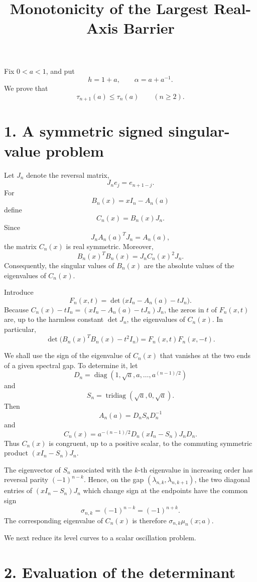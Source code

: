 \documentclass[11pt]{article}
\title{Monotonicity of the Largest Real-Axis Barrier}
\author{}
\date{}
\DeclareMathOperator{\tridiag}{tridiag}
\begin{document}
\maketitle

Fix \(0<a<1\), and put
\[
h=1+a,
\qquad
\alpha=a+a^{-1}.
\]
We prove that
\[
\tau_{n+1}(a)\leq \tau_n(a)
\qquad(n\geq2).
\]

\section*{1. A symmetric signed singular-value problem}

Let \(J_n\) denote the reversal matrix,
\[
J_ne_j=e_{n+1-j}.
\]
For
\[
B_n(x)=xI_n-A_n(a)
\]
define
\[
C_n(x)=B_n(x)J_n.
\]
Since
\[
J_nA_n(a)^TJ_n=A_n(a),
\]
the matrix \(C_n(x)\) is real symmetric. Moreover,
\[
B_n(x)^TB_n(x)
 =J_nC_n(x)^2J_n.
\]
Consequently, the singular values of \(B_n(x)\) are the absolute values of the
eigenvalues of \(C_n(x)\).

Introduce
\[
F_n(x,t)=\det\bigl(xI_n-A_n(a)-tJ_n\bigr).
\]
Because \(C_n(x)-tI_n=(xI_n-A_n(a)-tJ_n)J_n\), the zeros in \(t\) of
\(F_n(x,t)\) are, up to the harmless constant \(\det J_n\), the eigenvalues of
\(C_n(x)\). In particular,
\[
\det\bigl(B_n(x)^TB_n(x)-t^2I_n\bigr)
 =F_n(x,t)F_n(x,-t).
\tag{1}
\]

We shall use the sign of the eigenvalue of \(C_n(x)\) that vanishes at the two
ends of a given spectral gap. To determine it, let
\[
D_n=\operatorname{diag}(1,\sqrt a,a,\ldots,a^{(n-1)/2})
\]
and
\[
S_n=\tridiag(\sqrt a,0,\sqrt a).
\]
Then
\[
A_n(a)=D_nS_nD_n^{-1}
\]
and
\[
C_n(x)
 =a^{-(n-1)/2}D_n(xI_n-S_n)J_nD_n.
\tag{2}
\]
Thus \(C_n(x)\) is congruent, up to a positive scalar, to the commuting
symmetric product \((xI_n-S_n)J_n\).

The eigenvector of \(S_n\) associated with the \(k\)-th eigenvalue in increasing
order has reversal parity \((-1)^{n-k}\). Hence, on the gap
\((\lambda_{n,k},\lambda_{n,k+1})\), the two diagonal entries of
\((xI_n-S_n)J_n\) which change sign at the endpoints have the common sign
\[
\sigma_{n,k}=(-1)^{n-k}=(-1)^{n+k}.
\tag{3}
\]
The corresponding eigenvalue of \(C_n(x)\) is therefore
\(\sigma_{n,k}\mu_n(x;a)\).

We next reduce its level curves to a scalar oscillation problem.

\section*{2. Evaluation of the determinant}
\end{document}
